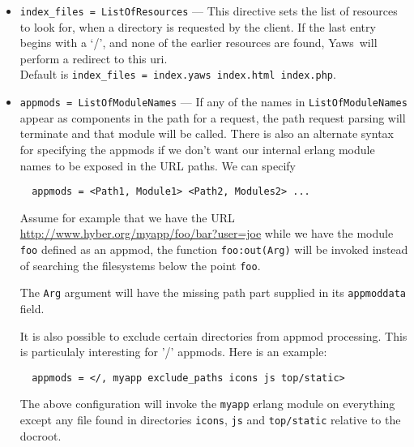 \documentclass[11pt,oneside,english]{book}
\newcommand{\Yaws}            %
        {{\sc Yaws}}
\begin{document}
\begin{itemize}
\item       \verb+index_files = ListOfResources+ ---
             This directive sets the list of resources to look for, when a
             directory is requested by the client. If the last entry begins with
             a `/', and none of the earlier resources are found, \Yaws\ will
             perform a redirect to this uri.\\
             Default is \verb+index_files = index.yaws index.html index.php+.

\item       \verb+appmods = ListOfModuleNames+ ---
             If any of the names in \verb+ListOfModuleNames+ appear as components
             in the path for a request, the path request parsing will terminate
             and that module will be called. There is also an alternate syntax
             for specifying the appmods if we don't want our internal erlang
             module names to be exposed in the URL paths.  We can specify
\begin{verbatim}
  appmods = <Path1, Module1> <Path2, Modules2> ...
\end{verbatim}
             Assume for example that we have the URL
             \url{http://www.hyber.org/myapp/foo/bar?user=joe} while we
             have the module \verb+foo+ defined as an appmod, the function
             \verb+foo:out(Arg)+ will be invoked instead of searching the
             filesystems below the point \verb+foo+.

             The \verb+Arg+ argument will have the missing path part supplied in
             its \verb+appmoddata+ field.

             It is also possible to exclude certain directories from appmod
             processing. This is particulaly interesting for '/' appmods.  Here
             is an example:
\begin{verbatim}
  appmods = </, myapp exclude_paths icons js top/static>
\end{verbatim}
             The above configuration will invoke the \verb+myapp+ erlang module
             on everything except any file found in directories \verb+icons+,
             \verb+js+ and \verb+top/static+ relative to the docroot.


\end{itemize}
\end{document}
